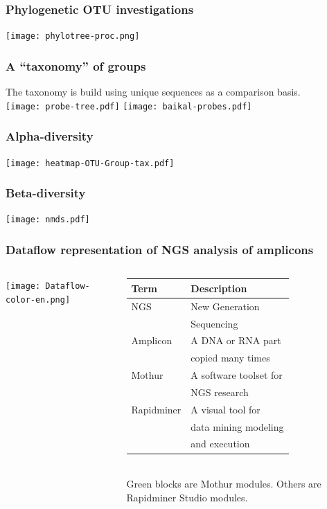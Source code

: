 \documentclass[10pt]{beamer}
\begin{document}
\begin{frame}
  \frametitle{Phylogenetic OTU investigations}
\centering
  \texttt{[image: phylotree-proc.png]}
\end{frame}

\begin{frame}
  \frametitle{A ``taxonomy'' of groups}
The taxonomy is build using unique sequences as a comparison basis. \\[2em]

\begingroup
\texttt{[image: probe-tree.pdf]}\hfil
\texttt{[image: baikal-probes.pdf]}
\endgroup
\end{frame}

\begin{frame}
  \frametitle{Alpha-diversity}
\centering
  \texttt{[image: heatmap-OTU-Group-tax.pdf]}
\end{frame}

\begin{frame}
  \frametitle{Beta-diversity}
  \texttt{[image: nmds.pdf]}
\end{frame}

\begin{frame}
  \frametitle{Dataflow representation of NGS analysis of amplicons}
  \begin{columns}
    \begin{column}{0.6\textwidth}
      \begin{raggedright}
        \texttt{[image: Dataflow-color-en.png]}
      \end{raggedright}
    \end{column}
    \begin{column}{0.4\textwidth}\footnotesize
      \begin{tabular}{ll}
        Term & Description \\
        \hline
        NGS & New Generation\\ & Sequencing\\
        Amplicon & A DNA or RNA part \\
                 & copied many times \\
        Mothur & A software toolset for\\ & NGS research \\
        Rapidminer & A visual tool for \\
             & data mining modeling\\
             &  and execution
      \end{tabular}
      ${}$\\[1em]
      Green blocks are Mothur modules. Others are Rapidminer Studio modules.
    \end{column}
  \end{columns}
\end{frame}
\end{document}

